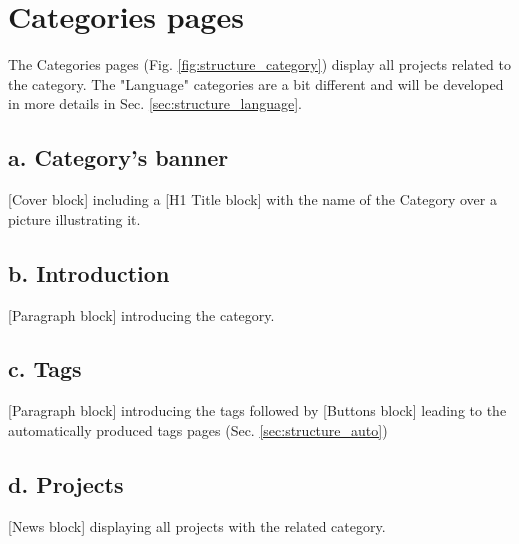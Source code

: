 \newpage

\section{Categories pages}\label{sec:structure_categories}

The Categories pages (Fig. \ref{fig:structure_category}) display all projects related to the category. The "Language" categories are a bit different and will be developed in more details in Sec. \ref{sec:structure_language}.

\subsection*{a. Category's banner}
[Cover block] including a [H1 Title block] with the name of the Category over a picture illustrating it.

\subsection*{b. Introduction}
[Paragraph block] introducing the category.

\subsection*{c. Tags}
[Paragraph block] introducing the tags followed by [Buttons block] leading to the automatically produced tags pages (Sec. \ref{sec:structure_auto})

\subsection*{d. Projects}
[News block] displaying all projects with the related category.

